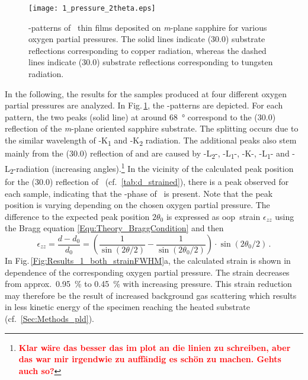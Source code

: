 \begin{figure}
    \centering
    \texttt{[image: 1\_pressure\_2theta.eps]}
    \caption{\thetaomega-patterns of \cro\ thin films deposited on \textit{m}-plane sapphire for various oxygen partial pressures.
    The solid lines indicate (30.0) substrate reflections corresponding to copper radiation, whereas the dashed lines indicate (30.0) substrate reflections corresponding to tungsten radiation.}
    \label{Fig:Results_1_pressure_2theta}
\end{figure}
In the following, the results for the samples produced at four different oxygen partial pressures are analyzed.
In Fig.\,\ref{Fig:Results_1_pressure_2theta}, the \thetaomega-patterns are depicted.
For each pattern, the two peaks (solid line) at around \qty{68}{\degree} correspond to the (30.0) reflection of the \textit{m}-plane oriented sapphire substrate.
The splitting occurs due to the similar wavelength of -K\textalpha\textsubscript{1} and -K\textalpha\textsubscript{2} radiation.
The additional peaks also stem mainly from the (30.0) reflection of  and are caused by
-L\textbeta\textsubscript{2}-,
-L\textbeta\textsubscript{1}-,
-K\textbeta-,
-L\textalpha\textsubscript{1}- and
-L\textalpha\textsubscript{2}-radiation (increasing angles).\footnote{
    \bfseries\textcolor{red}{Klar wäre das besser das im plot an die linien zu schreiben, aber das war mir irgendwie zu auffändig es schön zu machen. Gehts auch so?}
}
In the vicinity of the calculated peak position for the (30.0) reflection of \cro\ (cf.~\ref{tab:d_strained}), there is a peak observed for each sample, indicating that the \textalpha-phase of \cro\ is present.
Note that the peak position is varying depending on the chosen oxygen partial pressure.
The difference to the expected peak position $2\theta_0$ is expressed as \gls{oop}\ strain $\epsilon_{zz}$ using the Bragg equation \eqref{Equ:Theory_BraggCondition} and then
\begin{equation}
    \label{Equ:Results_oop_strain_def}
    \epsilon_{zz}
    =\frac{d-d_0}{d_0}
    =\left(\frac{1}{\sin(2\theta/2)}-\frac{1}{\sin(2\theta_0/2)}\right)
    \cdot\sin(2\theta_0/2)\,.
\end{equation}
In Fig.\,\ref{Fig:Results_1_both_strainFWHM}a, the calculated strain is shown in dependence of the corresponding oxygen partial pressure.
The strain decreases from approx.\ \qty{0.95}{\percent} to \qty{0.45}{\percent} with increasing pressure.
This strain reduction may therefore be the result of increased background gas scattering which results in less kinetic energy of the specimen reaching the heated substrate (cf.~\ref{Sec:Methods_pld}).
